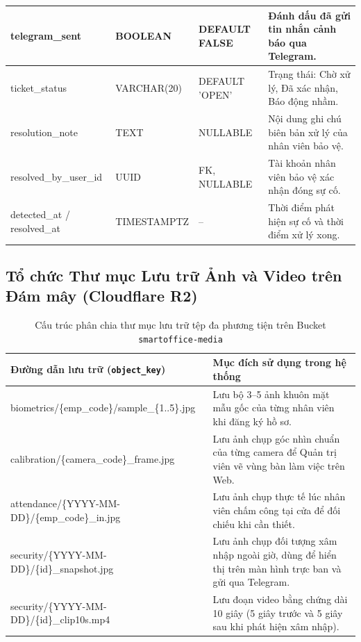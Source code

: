 \documentclass[12pt,a4paper]{article}
\begin{document}
\begin{longtable}{|M{\tabcolsep\relax}|L{\tabcolsep\relax}|L{\tabcolsep\relax}|L{\tabcolsep\relax}|}
\hline
telegram\_sent & BOOLEAN & DEFAULT FALSE & Đánh dấu đã gửi tin nhắn cảnh báo qua Telegram. \\
\hline
ticket\_status & VARCHAR(20) & DEFAULT 'OPEN' & Trạng thái: Chờ xử lý, Đã xác nhận, Báo động nhầm. \\
\hline
resolution\_note & TEXT & NULLABLE & Nội dung ghi chú biên bản xử lý của nhân viên bảo vệ. \\
\hline
resolved\_by\_user\_id & UUID & FK, NULLABLE & Tài khoản nhân viên bảo vệ xác nhận đóng sự cố. \\
\hline
detected\_at / resolved\_at & TIMESTAMPTZ & -- & Thời điểm phát hiện sự cố và thời điểm xử lý xong. \\
\hline
\end{longtable}
\setlength{\tabcolsep}{5pt}

\subsection{Tổ chức Thư mục Lưu trữ Ảnh và Video trên Đám mây (Cloudflare R2)}

\begin{table}[H]
\centering
\caption{Cấu trúc phân chia thư mục lưu trữ tệp đa phương tiện trên Bucket \texttt{smartoffice-media}}
\begin{tabular}{|M{\tabcolsep\relax}|L{\tabcolsep\relax}|}
\hline
{}
\normalfont\footnotesize\textbf{Đường dẫn lưu trữ (\texttt{object\_key})} & \textbf{Mục đích sử dụng trong hệ thống} \\
\hline
biometrics/\allowbreak\{emp\_code\}/\allowbreak sample\_\{1..5\}.jpg & Lưu bộ 3--5 ảnh khuôn mặt mẫu gốc của từng nhân viên khi đăng ký hồ sơ. \\
\hline
{}
calibration/\allowbreak\{camera\_code\}\_frame.jpg & Lưu ảnh chụp góc nhìn chuẩn của từng camera để Quản trị viên vẽ vùng bàn làm việc trên Web. \\
\hline
attendance/\allowbreak\{YYYY-MM-DD\}/\allowbreak\{emp\_code\}\_in.jpg & Lưu ảnh chụp thực tế lúc nhân viên chấm công tại cửa để đối chiếu khi cần thiết. \\
\hline
{}
security/\allowbreak\{YYYY-MM-DD\}/\allowbreak\{id\}\_snapshot.jpg & Lưu ảnh chụp đối tượng xâm nhập ngoài giờ, dùng để hiển thị trên màn hình trực ban và gửi qua Telegram. \\
\hline
security/\allowbreak\{YYYY-MM-DD\}/\allowbreak\{id\}\_clip10s.mp4 & Lưu đoạn video bằng chứng dài 10 giây (5 giây trước và 5 giây sau khi phát hiện xâm nhập). \\
\hline
\end{tabular}
\end{table}
\end{document}
